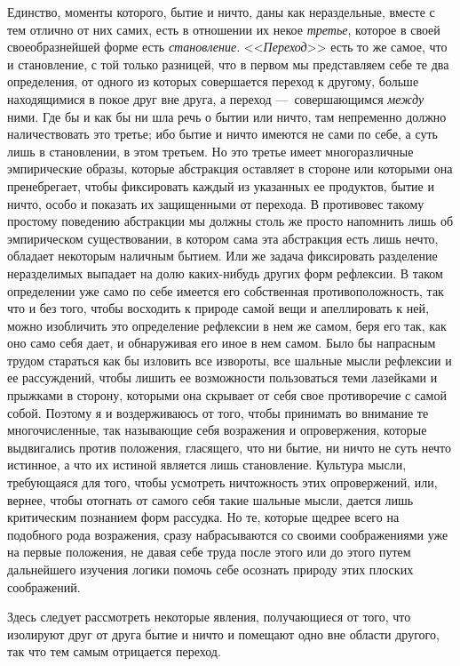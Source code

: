 Единство, моменты которого, бытие и ничто, даны как нераздельные, вместе с
тем отлично от них самих, есть в отношении их некое
{\em третье}, которое в своей своеобразнейшей форме
есть {\em становление}.
<<{\em Переход}>> есть то же самое, что и становление, с
той только разницей, что в первом мы представляем себе те два определения,
от одного из которых совершается переход к другому, больше находящимися в
покое друг вне друга, а переход ---~совершающимся
{\em между} ними. Где бы и как бы ни шла речь о бытии
или ничто, там непременно должно наличествовать это третье; ибо бытие и
ничто имеются не сами по себе, а суть лишь в становлении, в этом третьем.
Но это третье имеет многоразличные эмпирические образы, которые абстракция
оставляет в стороне или которыми она пренебрегает, чтобы фиксировать каждый
из указанных ее продуктов, бытие и ничто, особо и показать их защищенными
от перехода. В противовес такому простому поведению абстракции мы должны
столь же просто напомнить лишь об эмпирическом существовании, в котором
сама эта абстракция есть лишь нечто, обладает некоторым наличным бытием.
Или же задача фиксировать разделение неразделимых выпадает на долю
каких-нибудь других форм рефлексии. В таком определении уже само по себе
имеется его собственная противоположность, так что и без того, чтобы
восходить к природе самой вещи и апеллировать к ней, можно изобличить это
определение рефлексии в нем же самом, беря его так, как оно само себя дает,
и обнаруживая его иное в нем самом. Было бы напрасным трудом стараться
как бы изловить все извороты, все шальные мысли рефлексии и ее рассуждений,
чтобы лишить ее возможности пользоваться теми лазейками и прыжками в
сторону, которыми она скрывает от себя свое противоречие с самой собой.
Поэтому я и воздерживаюсь от того, чтобы принимать во внимание те
многочисленные, так называющие себя возражения и опровержения, которые
выдвигались против положения, гласящего, что ни бытие, ни ничто не суть
нечто истинное, а что их истиной является лишь становление. Культура мысли,
требующаяся для того, чтобы усмотреть ничтожность этих опровержений, или,
вернее, чтобы отогнать от самого себя такие шальные мысли, дается лишь
критическим познанием форм рассудка. Но те, которые щедрее всего на
подобного рода возражения, сразу набрасываются со своими соображениями уже
на первые положения, не давая себе труда после этого или до этого путем
дальнейшего изучения логики помочь себе осознать природу этих плоских
соображений.

Здесь следует рассмотреть некоторые явления, получающиеся от того, что
изолируют друг от друга бытие и ничто и помещают одно вне области другого,
так что тем самым отрицается переход.

